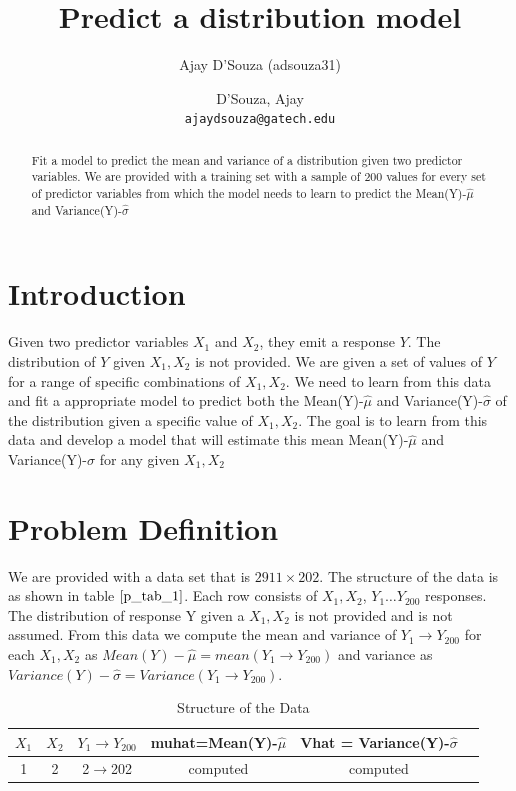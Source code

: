 \documentclass[twoside,12pt]{article}
\title{Predict a distribution model }
\author{Ajay D'Souza (adsouza31)}
\author{
  D'Souza, Ajay\\
  \texttt{ajaydsouza@gatech.edu}
}
\date{}
\begin{document}
\maketitle

\begin{abstract}
Fit a model to predict the mean and variance of a distribution given two predictor variables. We are provided with a training set with a sample of 200 values for every set of predictor variables from which the model needs to learn to predict the  Mean(Y)-$\hat{\mu}$ and Variance(Y)-$\hat{\sigma}$
\end{abstract}

\pagebreak
\tableofcontents

\pagebreak
\listoffigures
\listoftables

\pagebreak



%
%
\section{Introduction}
\label{Introduction}
Given two predictor variables $X_1$ and $X_2$, they emit a response $Y$. The distribution of $Y$ given $X_1,X_2$ is not provided. We are given a set of values of $Y$ for a range of  specific combinations of $X_1,X_2$. We need to learn from this data and fit a appropriate model to predict both the  Mean(Y)-$\hat{\mu}$ and Variance(Y)-$\hat{\sigma}$ of the distribution given a specific value of $X_1,X_2$. The goal is to learn from this data and develop a model that will estimate this mean Mean(Y)-$\hat{\mu}$ and  Variance(Y)-$\hat{\sigma}$ for any given $X_1,X_2$

  
\section{Problem Definition}
\label{Problem Definition}
We are provided with a data set that is $2911\times202$. The structure of the data is as shown in table $\eqref{p_tab_1}$. Each row consists of $X_1,X_2$, $Y_1 \dots Y_{200}$ responses. The distribution of response Y given a $X_1,X_2$ is not provided and is not assumed. From this data we compute the mean and variance of $Y_1 \to Y_{200}$ for each $X_1,X_2$ as $Mean(Y)-\hat{\mu} = mean(Y_1\to Y_{200})$ and variance as $Variance(Y)-\hat{\sigma} = Variance(Y_1\to Y_{200})$.

\begin{table}[h]
\centering

	\begin{tabular}{|c|c|c|c|c|c|}
		\hline
		$X_1$ & $X_2$ & $Y_1 \to Y_{200}$ & muhat=Mean(Y)-$\hat{\mu}$ & Vhat =  Variance(Y)-$\hat{\sigma}$\\
		\hline
		1 & 2 & 2$\to$202& computed & computed \\
		\hline
	\end{tabular}
	\caption[]{Structure of the Data}
	\label{p_tab_1}
\end{table}
\end{document}
